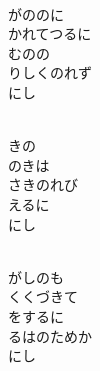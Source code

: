 \documentclass[10pt,b5j]{tarticle} %
\begin{document}
\vspace{1.5em} %
\newcommand{\linespace}{0.5em} %
\newcommand{\blocksize}{0.5\hsize} %
\newcommand{\itemmargin}{3em} %
\begin{enumerate} %
    \setlength{\itemindent}{\itemmargin} %
    \begin{minipage}[c]{\blocksize}
    
        \vspace{\linespace}
        \item~\\
        がののに\\
        かれてつるに\\
        むのの\\
        りしくのれず\\
        にし
        
    \end{minipage}
    \begin{minipage}[c]{\blocksize}
        
        \vspace{\linespace}
        \item~\\
        きの\\
        のきは\\
        さきのれび\\
        えるに\\
        にし
        
    \end{minipage}
    \begin{minipage}[c]{\blocksize}
        
        \vspace{\linespace}
        \item~\\
        がしのも\\
        くくづきて\\
        をするに\\
        るはのためか\\
        にし
        

\end{minipage}
\end{enumerate}
\end{document}
